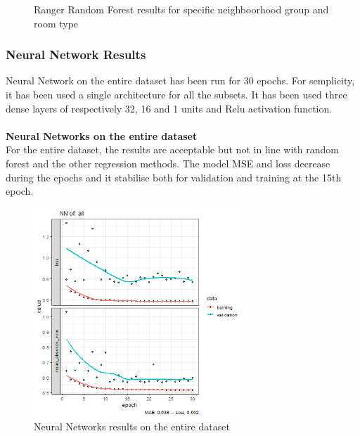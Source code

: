 \documentclass{FR16}
\begin{document}
\begin{figure}[!htb]
\begin{minipage}{0.48\textwidth}
   \end{minipage}
        \caption{Ranger Random Forest results for specific neighboorhood group and room type}\label{fig:18}

\end{figure}





\newpage
\subsubsection{Neural Network Results}
 Neural Network on the entire dataset has been run for 30 epochs. For semplicity, it has been used a single architecture for all the subsets. It has been used three dense layers of respectively 32, 16 and 1 units and Relu activation function.\\\\
\textbf{Neural Networks on the entire dataset }\\
\noindent
For the entire dataset, the results are acceptable but not in line with random forest and the other regression methods. The model MSE and loss decrease during the epochs and it stabilise both for validation and training at the 15th epoch.
\begin{figure}[h]
\centering
\includegraphics[width=0.7\textwidth]{figures/NN-all.PNG} 
 \caption{\label{fig:19} Neural Networks results on the entire dataset}
\end{figure}
\end{document}

